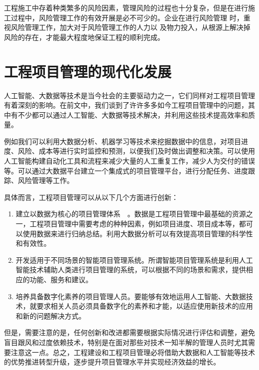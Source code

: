 	工程施工中存着种类繁多的风险因素，管理风险的过程也十分复杂，但是在进行施工过程中，风险管理工作的有效开展是必不可少的。企业在进行风险管理 时，重视风险管理工作，加大对于风险管理工作的人力以 及物力投入，从根源上解决掉风险的存在，才能最大程度地保证工程的顺利完成。
	
	\section{工程项目管理的现代化发展}
	
	人工智能、大数据等技术是当今社会的主要驱动力之一，它们同样对工程项目管理有着深刻的影响。在前文中，我们谈到了许许多多如今工程项目管理中的问题，其中有不少都可以通过人工智能、大数据等技术解决，并利用这些技术提高效率和质量。
	
	例如我们可以利用大数据分析、机器学习等技术来挖掘数据中的信息，对项目进度、风险、成本等进行实时监控和预测，以便我们及时做出调整和决策。可以使用人工智能构建自动化工具和流程来减少大量的人工重复工作，减少人为交付的错误等。可以通过大数据平台建立一个集成式的项目管理平台，进行分配任务、进度跟踪、风险管理等工作。
	
	具体而言，工程项目管理可以从以下几个方面进行创新：
	
	\begin{enumerate}
		\item 建立以数据为核心的项目管理体系~\cite{ChenSuFangShuJuKuJiShuZaiCeHuiGongChengXiangMuGuanLiZhongDeYingYong2022,HuZhenYuDaShuJuBeiJingXiaGongChengXiangMuGuanLiTanXi2022}~。数据是工程项目管理中最基础的资源之一，工程项目管理中需要考虑的种种因素，例如项目进度、项目成本等，都可以使用数据来进行归纳总结。利用大数据分析可以有效提高项目管理的科学性和有效性。
		\item 开发适用于不同场景的智能项目管理系统。所谓智能项目管理系统是利用人工智能技术辅助人类进行项目管理的系统，可以根据不同的场景和需求，提供相应的功能、服务和建议。
		\item 培养具备数字化素养的项目管理人员。要能够有效地运用人工智能、大数据技术，就要求相关人员必须具备数字化的素养和才能，以适应使用新技术的应用和新的问题解决方式。
	\end{enumerate}
	
	但是，需要注意的是，任何创新和改进都需要根据实际情况进行评估和调整，避免盲目跟风和过度依赖技术，特别是在面对那些对技术一知半解的管理人员时尤其需要注意这一点。总之，工程建设和工程项目管理必将借助大数据和人工智能等技术的优势推进转型升级，逐步提升项目管理水平并实现经济效益的增长。
	
	
	
	
